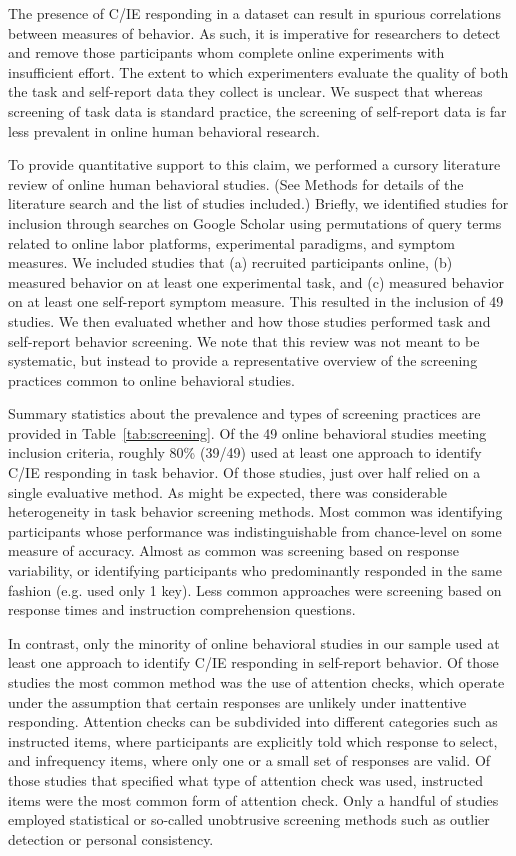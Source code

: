 \documentclass[a4paper,notitlepage,12pt]{article}
\begin{document}
The presence of C/IE responding in a dataset can result in spurious correlations between measures of behavior. As such, it is imperative for researchers to detect and remove those participants whom complete online experiments with insufficient effort. The extent to which experimenters evaluate the quality of both the task and self-report data they collect is unclear. We suspect that whereas screening of task data is standard practice, the screening of self-report data is far less prevalent in online human behavioral research. 

To provide quantitative support to this claim, we performed a cursory literature review of online human behavioral studies. (See Methods for details of the literature search and the list of studies included.) Briefly, we identified studies for inclusion through searches on Google Scholar using permutations of query terms related to online labor platforms, experimental paradigms, and symptom measures. We included studies that (a) recruited participants online, (b) measured behavior on at least one experimental task, and (c) measured behavior on at least one self-report symptom measure. This resulted in the inclusion of 49 studies. We then evaluated whether and how those studies performed task and self-report behavior screening. We note that this review was not meant to be systematic, but instead to provide a representative overview of the screening practices common to online behavioral studies.

Summary statistics about the prevalence and types of screening practices are provided in Table~\ref{tab:screening}. Of the 49 online behavioral studies meeting inclusion criteria, roughly 80\% (39/49) used at least one approach to identify C/IE responding in task behavior. Of those studies, just over half relied on a single evaluative method. As might be expected, there was considerable heterogeneity in task behavior screening methods. Most common was identifying participants whose performance was indistinguishable from chance-level on some measure of accuracy. Almost as common was screening based on response variability, or identifying participants who predominantly responded in the same fashion (e.g. used only 1 key). Less common approaches were screening based on response times and instruction comprehension questions. 

In contrast, only the minority of online behavioral studies in our sample used at least one approach to identify C/IE responding in self-report behavior. Of those studies the most common method was the use of attention checks, which operate under the assumption that certain responses are unlikely under inattentive responding. Attention checks can be subdivided into different categories such as instructed items, where participants are explicitly told which response to select, and infrequency items, where only one or a small set of responses are valid. Of those studies that specified what type of attention check was used, instructed items were the most common form of attention check. Only a handful of studies employed statistical or so-called unobtrusive screening methods such as outlier detection or personal consistency. 
\end{document}
